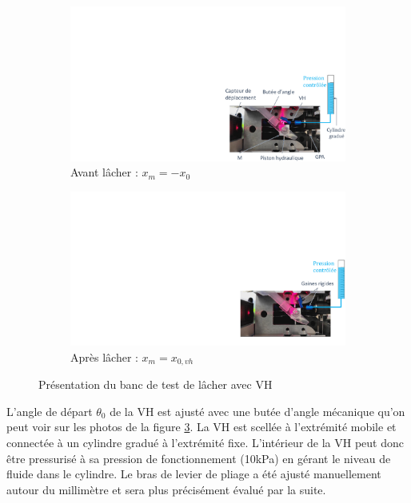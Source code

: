 \begin{figure}[!htbp]
\begin{center}
	\begin{subfigure}[b]{0.49\textwidth}
    \captionsetup{justification=centering} 
	\includegraphics[trim={19cm 0cm 0cm 8cm},clip,width=\textwidth]{../Chap6/Figure/presentation_BDT_avant_actionnement.pdf}
	\caption{Avant lâcher : $x_m=-x_0$}
	\label{fig:presentation_BDT_lacher_avant_actionnement}
	\end{subfigure}
\hfillx
	\begin{subfigure}[b]{0.49\textwidth}
    \captionsetup{justification=centering} 
	\includegraphics[trim={19cm 0cm 0cm 8cm},clip,width=\textwidth]{../Chap6/Figure/presentation_BDT_apres_actionnement.pdf}
	\caption{Après lâcher : $x_m=x_{0,vh}$}
	\label{fig:presentation_BDT_lacher_apres_actionnement}
	\end{subfigure}
	\caption{Présentation du banc de test de lâcher avec VH}
	\label{fig:presentation_BDT_lacher_tube}
\end{center}	
\end{figure} 
L'angle de départ $\theta_0$ de la VH est ajusté avec une butée d'angle mécanique qu'on peut voir sur les photos de la figure \ref{fig:presentation_BDT_lacher_tube}. La VH est scellée à l'extrémité mobile et connectée à un cylindre gradué à l'extrémité fixe. L'intérieur de la VH peut donc être pressurisé à sa pression de fonctionnement (10kPa) en gérant le niveau de fluide dans le cylindre. Le bras de levier de pliage a été ajusté manuellement autour du millimètre et sera plus précisément évalué par la suite.

